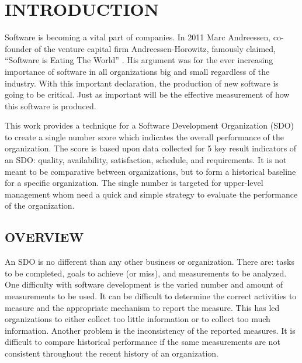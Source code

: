 \documentclass[SDSUThesis.tex]{subfiles}
\begin{document}
\newpage
{}
\setcounter{tocdepth}{2}

\section{INTRODUCTION}

    Software is becoming a vital part of companies. In 2011 Marc Andreessen, 
    co-founder of the venture capital firm Andreessen-Horowitz,
    famously claimed, ``Software is Eating The World'' \cite{Andreessen2001}. 
    His argument was for the ever increasing importance of software
    in all organizations big and small regardless of the industry.  With 
    this important declaration, the production of new software is
    going to be critical.  Just as important will be the effective 
    measurement of how this software is produced.  
    
    This work 
    provides a technique for a Software Development Organization (SDO) to create
    a single number score which indicates the overall performance
    of the organization. The
    score is based upon data collected for 5 key result indicators
    of an SDO: quality, availability,
    satisfaction, schedule, and requirements.  It is not meant
    to be comparative between organizations, but to 
    form a historical baseline for a specific organization.  The single
    number is targeted for upper-level management whom need a quick
    and simple strategy to evaluate the performance of the organization.

\subsection{OVERVIEW}
    
    An SDO is no different than 
    any other business or organization.  There are: tasks
    to be completed, goals to achieve (or miss), and measurements
    to be analyzed.  One difficulty with software development
    is the varied number and amount of measurements to be used. 
    It can be difficult to determine the correct activities
    to measure and the appropriate mechanism to report the measure.
    This has led organizations to either collect too little information
    or to collect too much information.  Another problem is the 
    inconsistency of the reported measures.  It is difficult to compare
    historical performance if the same measurements are not consistent
    throughout the recent history of an organization. 
    
\end{document}
